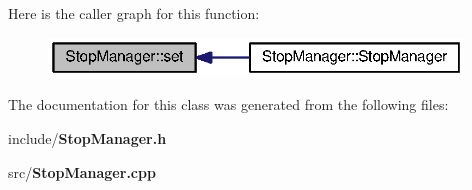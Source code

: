 Here is the caller graph for this function\+:
\nopagebreak
\begin{figure}[H]
\begin{center}
\leavevmode
\includegraphics[width=312pt]{class_stop_manager_a2c22b4194c71d20793efbb69be1ba548_icgraph}
\end{center}
\end{figure}




The documentation for this class was generated from the following files\+:\begin{DoxyCompactItemize}
\item 
include/{\bf Stop\+Manager.\+h}\item 
src/{\bf Stop\+Manager.\+cpp}\end{DoxyCompactItemize}
